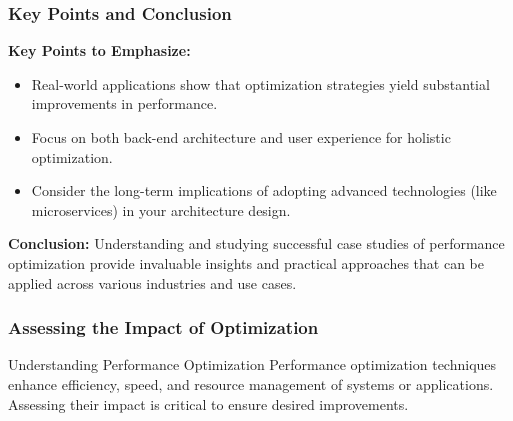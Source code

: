 \documentclass[aspectratio=169]{beamer}
\begin{document}
\begin{frame}[fragile]
    \frametitle{Key Points and Conclusion}
    \textbf{Key Points to Emphasize:}
    \begin{itemize}
        \item Real-world applications show that optimization strategies yield substantial improvements in performance.
        \item Focus on both back-end architecture and user experience for holistic optimization.
        \item Consider the long-term implications of adopting advanced technologies (like microservices) in your architecture design.
    \end{itemize}
    
    \textbf{Conclusion:} Understanding and studying successful case studies of performance optimization provide invaluable insights and practical approaches that can be applied across various industries and use cases.
\end{frame}

\begin{frame}[fragile]
    \frametitle{Assessing the Impact of Optimization}
    \begin{block}{Understanding Performance Optimization}
        Performance optimization techniques enhance efficiency, speed, and resource management of systems or applications. 
        Assessing their impact is critical to ensure desired improvements.
    \end{block}
\end{frame}
\end{document}
